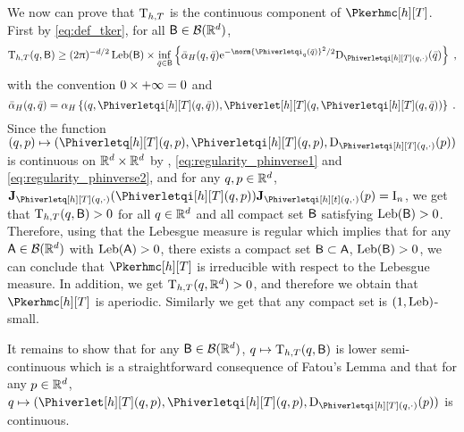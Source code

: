 We now can prove that $\mathrm{T}_{h,T}$ is the continuous component of $\Pkerhmc[h][T]$. First by \eqref{eq:def_tker}, for all $\mathsf{B} \in \mathcal{B}(\mathbb{R}^d)$,
\begin{equation}
\label{eq:minoration_pseudo_density_P}
    \Tker_{h,T}(q, \eventB) \geq (2 \uppi)^{-d/2} \Leb(\eventB)
 \times \inf_{\bar{q} \in \eventB} \defEns{ \balphaacc(q,\bar{q}) \rme^{-\norm{\Phiverletqi_q(\bar{q})}^2/2}\detj_{\Phiverletqi[h][T](q,\cdot)}(\bar{q})} \eqsp,
\end{equation}
with the convention $0 \times +\infty = 0$ and
\begin{equation}
  \balphaacc(q,\bar{q}) =  \alphaacc\defEns{(q,\Phiverletqi[h][T](q,\bar{q})),\Phiverlet[h][T](q,\Phiverletqi[h][T](q,\bar{q}))}\eqsp. 
\end{equation}
Since the function $  (q,p) \mapsto (\Phiverletq[h][T](q,p),\Phiverletqi[h][T](q,p), \detj_{\Phiverletqi[h][T](q,\cdot)}(p)) $
is continuous on $\mathbb{R}^d\times \mathbb{R}^d$ by , \eqref{eq:regularity_phinverse1} and \eqref{eq:regularity_phinverse2}, and for any $q,p \in \mathbb{R}^d$, $\Jac_{\Phiverletq[h][T](\q,\cdot)}(\Phiverletqi[h][T](q,p))
\Jac_{\Phiverletqi[h][t](q,\cdot)}(\p) = \operatorname{I}_n$, we get that  $\mathrm{T}_{h,T}(q,\mathsf{B}) >0$ for all $q \in \mathbb{R}^d$ and all compact set $\mathsf{B}$ satisfying $\operatorname{Leb}(\mathsf{B}) > 0$. Therefore, using that the Lebesgue measure is regular which implies that for any $\mathsf{A} \in \mathcal{B}(\mathbb{R}^d)$ with $\operatorname{Leb}(\mathsf{A}) >0$, there exists a compact set $\mathsf{B} \subset\mathsf{A}$, $\operatorname{Leb}(\mathsf{B})>0$, we can conclude that $\Pkerhmc[h][T]$ is irreducible with respect to the Lebesgue measure. In addition, we get  $\mathrm{T}_{h,T}(q,\mathbb{R}^d) >0$, and therefore we obtain that $\Pkerhmc[h][T]$ is aperiodic.  Similarly we get that any compact set is $(1,\operatorname{Leb})$-small.

It remains to show that for any $\mathsf{B} \in\mathcal{B}(\mathbb{R}^d)$, $q \mapsto \mathrm{T}_{h,T}(q,\mathsf{B})$ is lower semi-continuous which is a straightforward consequence of Fatou's Lemma and that for any $p \in \mathbb{R}^d$, $q \mapsto (\Phiverlet[h][T](q,p), \Phiverletqi[h][T](q,p),\detj_{\Phiverletqi[h][T](q,\cdot)}(p))$ is continuous.

